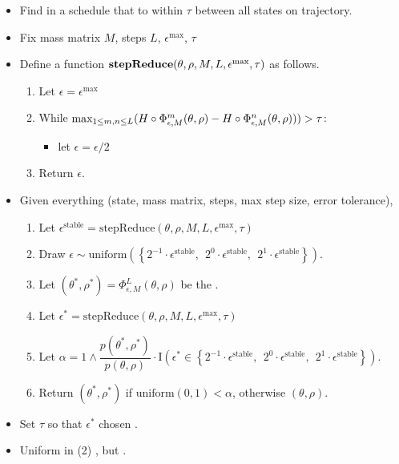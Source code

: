 \documentclass[10pt]{report}
\begin{document}
\begin{itemize}
\item Find  in a schedule that  to within $\tau$ between all states on trajectory.
\item Fix mass matrix $M$, steps $L$, 
  $\epsilon^\text{max}$,  $\tau$
\item Define a function $\textrm{\bfseries stepReduce}(\theta, \rho, M, L, \epsilon^\text{max}, \tau)$ as follows.
\begin{enumerate}
  \item Let $\epsilon = \epsilon^\text{max}$
  \item While $\textrm{max}_{\normalsize 1 \leq m, n \leq L}(H \circ \Phi^m_{\epsilon, M}(\theta, \rho) - H \circ \Phi^n_{\epsilon,M}(\theta, \rho))) > \tau$:
    \begin{itemize}
    \item let $\epsilon = \epsilon / 2$
    \end{itemize}
  \item Return $\epsilon$.
\end{enumerate}
\end{itemize}

\begin{itemize}
\item Given everything (state, mass matrix, steps, max step size, error tolerance),
  \begin{enumerate}
  \item Let $\epsilon^\text{stable} = \text{stepReduce}(\theta, \rho, M, L, \epsilon^\text{max}, \tau)$
  \item Draw $\epsilon \sim \textrm{uniform}\!\left(\left\{ 2^{-1} \cdot \epsilon^\text{stable}, \ \ 2^{0} \cdot \epsilon^\text{stable}, \ \ 2^{1} \cdot \epsilon^\text{stable}\right\}\right).$
  \item Let $(\theta^*, \rho^*) = \Phi^L_{\epsilon, M}(\theta, \rho)$ be the .
  \item Let $\epsilon^* = \text{stepReduce}(\theta, \rho, M, L, \epsilon^\text{max}, \tau)$
  \item Let $\alpha = 1 \wedge \dfrac{p(\theta^*, \rho^*)}{p(\theta, \rho)}
    \cdot
    \textrm{I}\!\left(\epsilon^* \in
      \left\{ 2^{-1} \cdot \epsilon^\text{stable}, \ \ 2^{0} \cdot \epsilon^\text{stable}, \ \ 2^{1} \cdot \epsilon^\text{stable}\right\}
    \right).$
    \item Return $(\theta^*, \rho^*)$ if $\textrm{uniform}(0, 1) < \alpha$, otherwise $(\theta, \rho)$.
    \end{enumerate}
  \item Set $\tau$ so that  $\epsilon^*$ chosen .
  \item Uniform in (2) , but .
\end{itemize}
\end{document}
